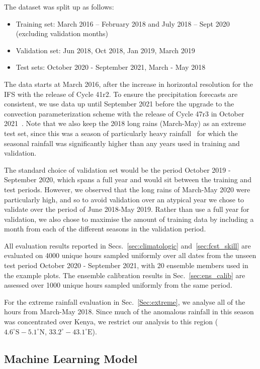 \documentclass{article}
\begin{document}
The dataset was split up as follows:
\begin{itemize}
    \item Training set: March 2016 – February 2018 and July 2018 – Sept 2020 (excluding validation months)
    \item Validation set: Jun 2018, Oct 2018, Jan 2019, March 2019
    \item Test sets: October 2020 - September 2021, March - May 2018
\end{itemize}
The data starts at March 2016, after the increase in horizontal resolution for the IFS with the release of Cycle 41r2. To ensure the precipitation forecasts are consistent, we use data up until September 2021 before the upgrade to the convection parameterization scheme with the release of Cycle 47r3 in October 2021~\cite{ecmwf_changes_2023}. Note that we also keep the 2018 long rains (March-May) as an extreme test set, since this was a season of particularly heavy rainfall~\citep{kilavi_extreme_2018} for which the seasonal rainfall was significantly higher than any years used in training and validation. 

The standard choice of validation set would be the period October 2019 - September 2020, which spans a full year and would sit between the training and test periods. However, we observed that the long rains of March-May 2020 were particularly high, and so to avoid validation over an atypical year we chose to validate over the period of June 2018-May 2019. Rather than use a full year for validation, we also chose to maximise the amount of training data by including a month from each of the different seasons in the validation period.

All evaluation results reported in Secs.~\ref{sec:climatologic} and~\ref{sec:fcst_skill} are evaluated on 4000 unique hours sampled uniformly over all dates from the unseen test period October 2020 - September 2021, with 20 ensemble members used in the example plots. The ensemble calibration results in Sec.~\ref{sec:ens_calib} are assessed over 1000 unique hours sampled uniformly from the same period. 

For the extreme rainfall evaluation in Sec.~\ref{Sec:extreme}, we analyse all of the hours from March-May 2018. Since much of the anomalous rainfall in this season was concentrated over Kenya, we restrict our analysis to this region ($4.6^{\circ}\text{S}-5.1^{\circ}\text{N}$, $33.2^{\circ}-43.1^{\circ}\text{E}$).


\subsection{Machine Learning Model}
\end{document}
